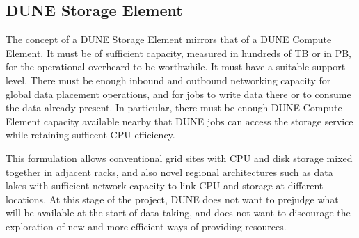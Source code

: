 \documentclass[../main-v1.tex]{subfiles}
\begin{document}
{%
\subsection{DUNE Storage Element}
\label{sec:cm:dse}

The concept of a DUNE Storage Element mirrors that of a DUNE Compute Element. It must be of sufficient capacity, measured in hundreds of TB or in PB, for the operational overheard to be worthwhile. It must have a suitable support level. %
There must be enough inbound and outbound networking capacity for global data placement operations, and for jobs to write data there or to consume the data already present. In particular, there must be %
enough DUNE Compute Element capacity available nearby %
that DUNE jobs can access the storage service %
while retaining sufficent CPU efficiency.

This formulation allows conventional grid sites with CPU and disk storage mixed together in adjacent racks, and also novel regional architectures such as data lakes %
with sufficient network capacity to link CPU and storage at different locations. At this stage of the project, DUNE does not want to prejudge what will be available at the start of data taking, and does not want to discourage the exploration of new and more efficient ways of providing resources.



}
\end{document}

